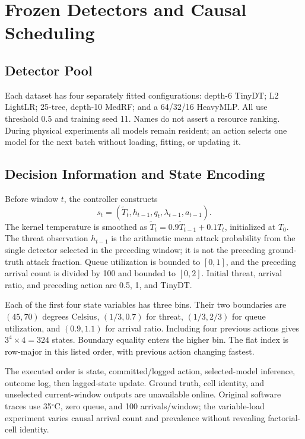 \section{Frozen Detectors and Causal Scheduling}
\subsection{Detector Pool}
Each dataset has four separately fitted configurations: depth-6 TinyDT; L2 LightLR; 25-tree, depth-10 MedRF; and a 64/32/16 HeavyMLP. All use threshold 0.5 and training seed 11. Names do not assert a resource ranking. During \ton{} physical experiments all models remain resident; an action selects one model for the next batch without loading, fitting, or updating it.

\subsection{Decision Information and State Encoding}
Before window $t$, the controller constructs
\begin{equation}
 s_t=(\widetilde T_t,h_{t-1},q_t,\lambda_{t-1},a_{t-1}).
\end{equation}
The kernel temperature is smoothed as $\widetilde T_t=0.9\widetilde T_{t-1}+0.1T_t$, initialized at $T_0$. The threat observation $h_{t-1}$ is the arithmetic mean attack probability from the single detector selected in the preceding window; it is not the preceding ground-truth attack fraction. Queue utilization is bounded to $[0,1]$, and the preceding arrival count is divided by 100 and bounded to $[0,2]$. Initial threat, arrival ratio, and preceding action are 0.5, 1, and TinyDT.

Each of the first four state variables has three bins. Their two boundaries are $(45,70)$ degrees Celsius, $(1/3,0.7)$ for threat, $(1/3,2/3)$ for queue utilization, and $(0.9,1.1)$ for arrival ratio. Including four previous actions gives $3^4\times4=324$ states. Boundary equality enters the higher bin. The flat index is row-major in this listed order, with previous action changing fastest.

The executed order is state, committed/logged action, selected-model inference, outcome log, then lagged-state update. Ground truth, cell identity, and unselected current-window outputs are unavailable online. Original software traces use 35$^\circ$C, zero queue, and 100 arrivals/window; the variable-load experiment varies causal arrival count and prevalence without revealing factorial-cell identity.

